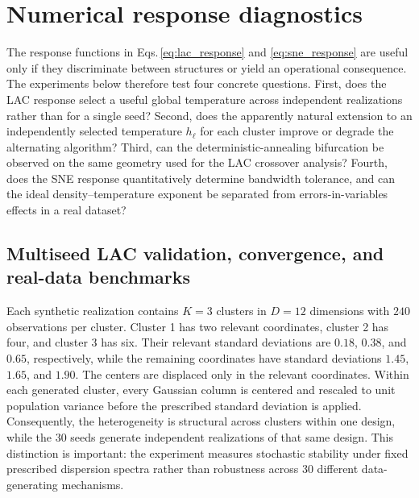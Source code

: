 \documentclass[11pt,a4paper]{article}
\theoremstyle{definition}
\theoremstyle{plain}
\begin{document}
\section{Numerical response diagnostics}
\label{sec:numerical}

The response functions in Eqs.\,\eqref{eq:lac_response} and \eqref{eq:sne_response} are useful only if they discriminate between structures or yield an operational consequence. The experiments below therefore test four concrete questions. First, does the LAC response select a useful global temperature across independent realizations rather than for a single seed? Second, does the apparently natural extension to an independently selected temperature $h_\ell$ for each cluster improve or degrade the alternating algorithm? Third, can the deterministic-annealing bifurcation be observed on the same geometry used for the LAC crossover analysis? Fourth, does the SNE response quantitatively determine bandwidth tolerance, and can the ideal density--temperature exponent be separated from errors-in-variables effects in a real dataset?

\subsection{Multiseed LAC validation, convergence, and real-data benchmarks}
\label{subsec:numerical_lac}

Each synthetic realization contains $K=3$ clusters in $D=12$ dimensions with $240$ observations per cluster. Cluster 1 has two relevant coordinates, cluster 2 has four, and cluster 3 has six. Their relevant standard deviations are $0.18$, $0.38$, and $0.65$, respectively, while the remaining coordinates have standard deviations $1.45$, $1.65$, and $1.90$. The centers are displaced only in the relevant coordinates. Within each generated cluster, every Gaussian column is centered and rescaled to unit population variance before the prescribed standard deviation is applied. Consequently, the heterogeneity is structural across clusters within one design, while the 30 seeds generate independent realizations of that same design. This distinction is important: the experiment measures stochastic stability under fixed prescribed dispersion spectra rather than robustness across 30 different data-generating mechanisms.
\end{document}
